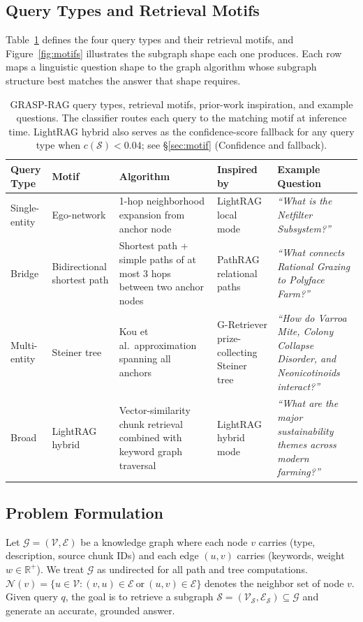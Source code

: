 \subsection{Query Types and Retrieval Motifs}
\label{sec:motifs_table}

Table~\ref{tab:motifs} defines the four query types and their retrieval motifs,
and Figure~\ref{fig:motifs} illustrates the subgraph shape each one produces.
Each row maps a linguistic question shape to the graph algorithm whose subgraph
structure best matches the answer that shape requires.

\begin{table}[t]
\caption{GRASP-RAG query types, retrieval motifs, prior-work inspiration, and
  example questions. The classifier routes each query to the matching motif at
  inference time. LightRAG hybrid also serves as the confidence-score fallback
  for any query type when $c(\mathcal{S}) < 0.04$; see
  \S\ref{sec:motif} (Confidence and fallback).}
\label{tab:motifs}
\centering
\renewcommand{\arraystretch}{1.25}
\setlength{\tabcolsep}{4pt}
\begin{tabular}{llp{2.6cm}p{3.6cm}p{5.0cm}}
\toprule
\textbf{Query Type} & \textbf{Motif} & \textbf{Algorithm} &
  \textbf{Inspired by} & \textbf{Example Question} \\
\midrule
Single-entity & Ego-network &
  1-hop neighborhood expansion from anchor node &
  LightRAG local mode~\cite{guo2024lightrag} &
  \textit{``What is the Netfilter Subsystem?''} \\
Bridge & Bidirectional shortest path &
  Shortest path + simple paths of at most 3 hops between two anchor nodes &
  PathRAG relational paths~\cite{chen2025pathrag} &
  \textit{``What connects Rational Grazing to Polyface Farm?''} \\
Multi-entity & Steiner tree &
  Kou et al.\ approximation spanning all anchors~\cite{kou1981fast} &
  G-Retriever prize-collecting Steiner tree~\cite{he2024g} &
  \textit{``How do Varroa Mite, Colony Collapse Disorder, and Neonicotinoids interact?''} \\
Broad & LightRAG hybrid &
  Vector-similarity chunk retrieval combined with keyword graph traversal &
  LightRAG hybrid mode~\cite{guo2024lightrag} &
  \textit{``What are the major sustainability themes across modern farming?''} \\
\bottomrule
\end{tabular}
\end{table}

\subsection{Problem Formulation}
Let $\mathcal{G} = (\mathcal{V}, \mathcal{E})$ be a knowledge graph where each
node $v$ carries (type, description, source chunk IDs) and each edge $(u,v)$
carries (keywords, weight $w \in \mathbb{R}^+$).
We treat $\mathcal{G}$ as undirected for all path and tree computations.
$\mathcal{N}(v) = \{u \in \mathcal{V} : (v,u)\in\mathcal{E}\ \text{or}\ (u,v)\in\mathcal{E}\}$
denotes the neighbor set of node $v$.
Given query $q$, the goal is to retrieve a subgraph
$\mathcal{S} = (\mathcal{V}_\mathcal{S}, \mathcal{E}_\mathcal{S}) \subseteq \mathcal{G}$
and generate an accurate, grounded answer.

